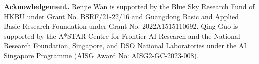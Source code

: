 \documentclass[10pt,twocolumn,letterpaper]{article}
\begin{document}
\noindent\textbf{Acknowledgement.}  Renjie Wan is supported by the Blue Sky Research Fund of HKBU under Grant No. BSRF/21-22/16 and Guangdong Basic and Applied Basic Research Foundation under Grant No. 2022A1515110692. Qing Guo is supported by the A*STAR Centre for Frontier AI Research and the National Research Foundation, Singapore, and DSO National Laboratories under the AI Singapore Programme (AISG Award No: AISG2-GC-2023-008).

\linespread{1.0}
\normalem
{\small


}
\end{document}
